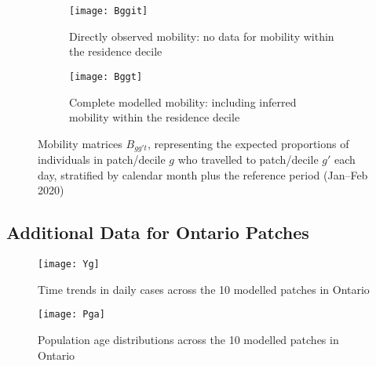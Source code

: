 \begin{figure}[ht]
  \centering
  \begin{subfigure}{\linewidth}
    \texttt{[image: Bggit]}
    \caption{Directly observed mobility: no data for mobility within the residence decile}
    \label{fig:Bggot}
  \end{subfigure}
  \begin{subfigure}{\linewidth}
    \texttt{[image: Bggt]}
    \caption{Complete modelled mobility: including inferred mobility within the residence decile}
    \label{fig:Bggdt}
  \end{subfigure}
  \caption{Mobility matrices $B_{gg't}$, representing the expected proportions of individuals
    in patch/decile $g$ who travelled to patch/decile $g'$ each day,
    stratified by calendar month plus the reference period (Jan--Feb 2020)}
  \label{fig:Bggt}
\end{figure}
\clearpage
\subsection{Additional Data for Ontario Patches}\label{app.covid}
\begin{figure}[ht]
  \centering
  \texttt{[image: Yg]}
  \caption{Time trends in daily \covid cases across the 10 modelled patches in Ontario}
  \label{fig:Yg}
\end{figure}
\begin{figure}[ht]
  \centering
  \texttt{[image: Pga]}
  \caption{Population age distributions across the 10 modelled patches in Ontario}
  \label{fig:Pga}
\end{figure}
